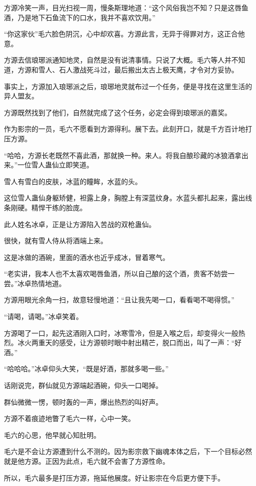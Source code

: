 \begin{this_body}
方源冷笑一声，目光扫视一周，慢条斯理地道：“这个风俗我岂不知？只是这唇鱼酒，乃是地下石鱼流下的口水，我并不喜欢饮用。”

“你这家伙”毛六脸色阴沉，心中却欢喜。方源此言，无异于得罪对方，这正合他意。

方源去信琅琊派通知地灵，自然是没有说清事情。只说了大概。毛六等人并不知道，方源和雪人、石人激战死斗过，最后搬出太古上极天鹰，才令对方妥协。

事实上，方源加入琅琊派之后，琅琊地灵就布过一个任务，便是寻找在这里生活的异人盟友。

方源既然找到了他们，自然就完成了这个任务，必定会得到琅琊派的嘉奖。

作为影宗的一员，毛六不愿看到方源得利。展下去。此刻开口，就是千方百计地打压方源。

“哈哈，方源长老既然不喜此酒，那就换一种。来人。将我自酿珍藏的冰狼酒拿出来。”一位雪人蛊仙立即笑道。

雪人有雪白的皮肤，冰蓝的瞳眸，水蓝的头。

这位雪人蛊仙身躯矫健，袒露上身，胸膛上有深蓝纹身。水蓝头都扎起来，露出线条刚硬。精悍干练的脸庞。

此人姓名冰卓，正是让方源陷入苦战的双枪蛊仙。

很快，就有雪人侍从将酒端上来。

这是冰做的酒碗，里面的酒水也近乎成冰，冒着寒气。

“老实讲，我本人也不太喜欢喝唇鱼酒，所以自己酿的这个酒，贵客不妨尝一尝。”冰卓热情地道。

方源用眼光余角一扫，故意轻慢地道：“且让我先喝一口，看看喝不喝得惯。”

“请喝，请喝。”冰卓笑着。

方源喝了一口，起先这酒刚入口时，冰寒雪冷，但是入喉之后，却变得火一般热烈。冰火两重天的感受，让方源顿时眼中射出精芒，脱口而出，叫了一声：“好酒。”

“哈哈哈。”冰卓仰头大笑，“既是好酒，那就多喝一些。”

话刚说完，群仙就见方源端起酒碗，仰头一口喝掉。

群仙微微一愣，顿时轰的一声，爆出热烈的叫好声。

方源不着痕迹地瞥了毛六一样，心中一笑。

毛六的心思，他早就心知肚明。

毛六是不会让方源遭到什么不测的。因为影宗救下幽魂本体之后，下一个目标必然就是他方源。正因为此点，毛六就不会害了方源性命。

所以，毛六最多是打压方源，拖延他展度。好让影宗在今后更方便下手。


\end{this_body}
